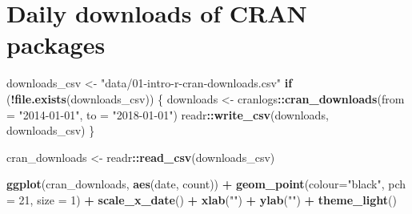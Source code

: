 \documentclass[]{book}
\newenvironment{Shaded}{\begin{snugshade}}{\end{snugshade}}
\newcommand{\KeywordTok}[1]{\textcolor[rgb]{0.13,0.29,0.53}{\textbf{#1}}}
\newcommand{\DataTypeTok}[1]{\textcolor[rgb]{0.13,0.29,0.53}{#1}}
\newcommand{\DecValTok}[1]{\textcolor[rgb]{0.00,0.00,0.81}{#1}}
\newcommand{\StringTok}[1]{\textcolor[rgb]{0.31,0.60,0.02}{#1}}
\newcommand{\ControlFlowTok}[1]{\textcolor[rgb]{0.13,0.29,0.53}{\textbf{#1}}}
\newcommand{\OperatorTok}[1]{\textcolor[rgb]{0.81,0.36,0.00}{\textbf{#1}}}
\newcommand{\NormalTok}[1]{#1}
\theoremstyle{definition}
\theoremstyle{definition}
\theoremstyle{definition}
\theoremstyle{remark}
\begin{document}
\section{Daily downloads of CRAN packages}\label{cran-downloads}

\begin{Shaded}
\begin{Highlighting}[]
\NormalTok{downloads_csv <-}\StringTok{ "data/01-intro-r-cran-downloads.csv"}
\ControlFlowTok{if}\NormalTok{ (}\OperatorTok{!}\KeywordTok{file.exists}\NormalTok{(downloads_csv)) \{}
\NormalTok{  downloads <-}\StringTok{ }\NormalTok{cranlogs}\OperatorTok{::}\KeywordTok{cran_downloads}\NormalTok{(}\DataTypeTok{from =} \StringTok{"2014-01-01"}\NormalTok{, }\DataTypeTok{to =} \StringTok{"2018-01-01"}\NormalTok{)}
\NormalTok{  readr}\OperatorTok{::}\KeywordTok{write_csv}\NormalTok{(downloads, downloads_csv)}
\NormalTok{\}}

\NormalTok{cran_downloads <-}\StringTok{ }\NormalTok{readr}\OperatorTok{::}\KeywordTok{read_csv}\NormalTok{(downloads_csv)}

\KeywordTok{ggplot}\NormalTok{(cran_downloads, }\KeywordTok{aes}\NormalTok{(date, count)) }\OperatorTok{+}\StringTok{ }
\StringTok{  }\KeywordTok{geom_point}\NormalTok{(}\DataTypeTok{colour=}\StringTok{"black"}\NormalTok{, }\DataTypeTok{pch =} \DecValTok{21}\NormalTok{, }\DataTypeTok{size =} \DecValTok{1}\NormalTok{) }\OperatorTok{+}
\StringTok{  }\KeywordTok{scale_x_date}\NormalTok{() }\OperatorTok{+}
\StringTok{  }\KeywordTok{xlab}\NormalTok{(}\StringTok{""}\NormalTok{) }\OperatorTok{+}
\StringTok{  }\KeywordTok{ylab}\NormalTok{(}\StringTok{""}\NormalTok{) }\OperatorTok{+}
\StringTok{  }\KeywordTok{theme_light}\NormalTok{()}
\end{Highlighting}
\end{Shaded}


\end{document}
